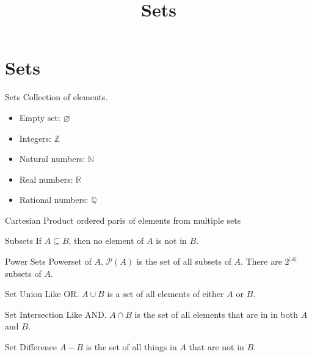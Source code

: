 \documentclass[smaller]{beamer}
\date{}
\title{Sets}
\begin{document}
\maketitle

\section{Sets}
\label{sec:org2a5e530}

\begin{frame}[label={sec:org5da47d1}]{Sets}
Collection of elements.

\begin{itemize}
\item Empty set: \(\varnothing\)
\item Integers: \(\mathbb{Z}\)
\item Natural numbers: \(\mathbb{N}\)
\item Real numbers: \(\mathbb{R}\)
\item Rational numbers: \(\mathbb{Q}\)
\end{itemize}
\end{frame}

\begin{frame}[label={sec:org1e6eb2d}]{Cartesian Product}
ordered paris of elements from multiple sets
\end{frame}

\begin{frame}[label={sec:orgc263bde}]{Subsets}
If \(A \subseteq B\), then no element of \(A\) is not in \(B\).
\end{frame}

\begin{frame}[label={sec:orgc1147e8}]{Power Sets}
Powerset of \(A\), \(\mathcal{P}(A)\) is the set of all subsets of \(A\).  There are \(2^{|A|}\) subsets of \(A\).
\end{frame}

\begin{frame}[label={sec:org586b165}]{Set Union}
Like OR.  \(A \cup B\) is a set of all elements of either \(A\) or \(B\).
\end{frame}

\begin{frame}[label={sec:orgf75a389}]{Set Intersection}
Like AND.  \(A \cap B\) is the set of all elements that are in in both \(A\) and \(B\).
\end{frame}

\begin{frame}[label={sec:org84bacbe}]{Set Difference}
\(A - B\) is the set of all things in \(A\) that are not in \(B\).
\end{frame}
\end{document}
